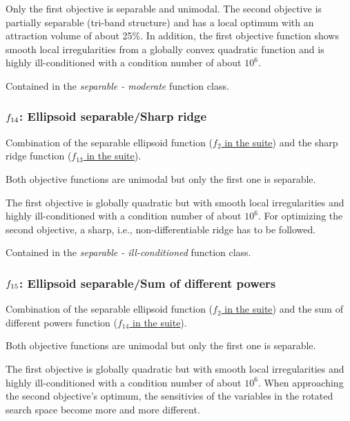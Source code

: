 \documentclass[letterpaper,12pt,english]{article}
\begin{document}
Only the first objective is separable and unimodal. The second
objective is partially separable (tri-band structure) and has a local
optimum with an attraction volume of about 25\%.
In addition, the first objective function shows smooth local
irregularities from a globally convex quadratic function and is
highly ill-conditioned with a condition number of about
\(10^6\).

Contained in the \emph{separable - moderate} function class.


\subsubsection{\protect\(f_{14}\protect\): Ellipsoid separable/Sharp ridge}
\label{index:f14}\label{index:ellipsoid-separable-sharp-ridge}
Combination of the separable ellipsoid function (\href{http://coco.lri.fr/downloads/download15.03/bbobdocfunctions.pdf\#page=10}{\(f_2\) in the  suite}) and the sharp ridge function (\href{http://coco.lri.fr/downloads/download15.03/bbobdocfunctions.pdf\#page=65}{\(f_{13}\) in the  suite}).

Both objective functions are unimodal but only the first one is
separable.

The first objective is globally quadratic but with smooth local
irregularities and highly ill-conditioned with a condition number of
about \(10^6\). For optimizing the second objective, a sharp,
i.e., non-differentiable ridge has to be followed.

Contained in the \emph{separable - ill-conditioned} function class.


\subsubsection{\protect\(f_{15}\protect\): Ellipsoid separable/Sum of different powers}
\label{index:ellipsoid-separable-sum-of-different-powers}\label{index:f15}
Combination of the separable ellipsoid function (\href{http://coco.lri.fr/downloads/download15.03/bbobdocfunctions.pdf\#page=10}{\(f_2\) in the  suite}) and the sum of different powers function
(\href{http://coco.lri.fr/downloads/download15.03/bbobdocfunctions.pdf\#page=70}{\(f_{14}\) in the  suite}).

Both objective functions are unimodal but only the first one is
separable.

The first objective is globally quadratic but with smooth local
irregularities and highly ill-conditioned with a condition number of
about \(10^6\). When approaching the second objective's optimum,
the sensitivies of the variables in the rotated search space become
more and more different.
\end{document}
